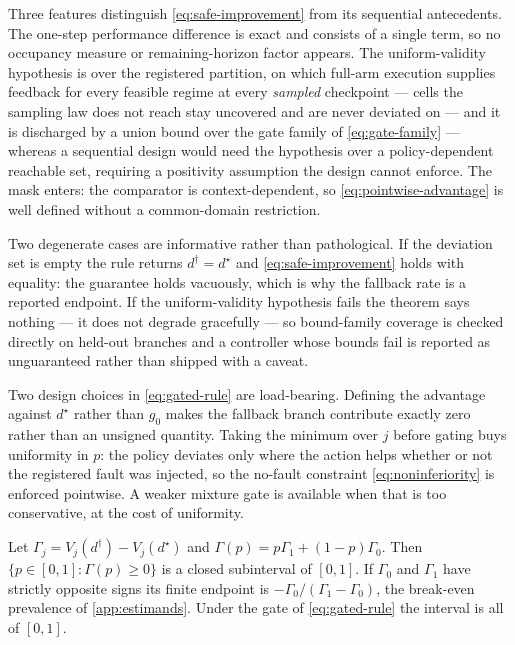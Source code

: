 Three features distinguish \eqref{eq:safe-improvement} from its sequential
antecedents.  The one-step performance difference is exact and consists of a
single term, so no occupancy measure or remaining-horizon factor appears.  The
uniform-validity hypothesis is over the registered partition, on which
full-arm execution supplies feedback for every feasible regime at every
\emph{sampled} checkpoint --- cells the sampling law does not reach stay
uncovered and are never deviated on --- and it is discharged by a union bound
over the gate family of \cref{eq:gate-family} ---
whereas a sequential design would need the hypothesis over a policy-dependent
reachable set, requiring a positivity assumption the design cannot enforce.  The
mask enters: the comparator is context-dependent, so \eqref{eq:pointwise-advantage}
is well defined without a common-domain restriction.

Two degenerate cases are informative rather than pathological.  If the deviation
set is empty the rule returns $d^\dagger=d^\star$ and
\eqref{eq:safe-improvement} holds with equality: the guarantee holds vacuously,
which is why the fallback rate is a reported endpoint.  If the uniform-validity
hypothesis fails the theorem says nothing --- it does not degrade gracefully ---
so bound-family coverage is checked directly on held-out branches and a
controller whose bounds fail is reported as unguaranteed rather than shipped
with a caveat.

Two design choices in \eqref{eq:gated-rule} are load-bearing.  Defining the
advantage against $d^\star$ rather than $g_0$ makes the fallback branch
contribute exactly zero rather than an unsigned quantity.  Taking the minimum
over $j$ before gating buys uniformity in $p$: the policy deviates only where
the action helps whether or not the registered fault was injected, so the
no-fault constraint \eqref{eq:noninferiority} is enforced pointwise.  A weaker
mixture gate is available when that is too conservative, at the cost of
uniformity.

\begin{corollary}
\label{cor:interval}
Let $\Gamma_j=V_j(d^\dagger)-V_j(d^\star)$ and
$\Gamma(p)=p\Gamma_1+(1-p)\Gamma_0$.  Then $\{p\in[0,1]:\Gamma(p)\ge0\}$ is a
closed subinterval of $[0,1]$.  If $\Gamma_0$ and $\Gamma_1$ have strictly
opposite signs its finite endpoint is $-\Gamma_0/(\Gamma_1-\Gamma_0)$, the
break-even prevalence of \cref{app:estimands}.  Under the gate of
\eqref{eq:gated-rule} the interval is all of $[0,1]$.
\end{corollary}

